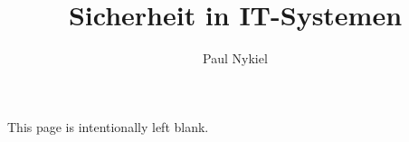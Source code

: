 \documentclass[10pt]{report}
\title{Sicherheit in IT-Systemen}
\author{Paul Nykiel}
\begin{document}
    \maketitle
    \pagebreak
    This page is intentionally left blank.
    \pagebreak
    \tableofcontents
    \pagebreak
\end{document}
